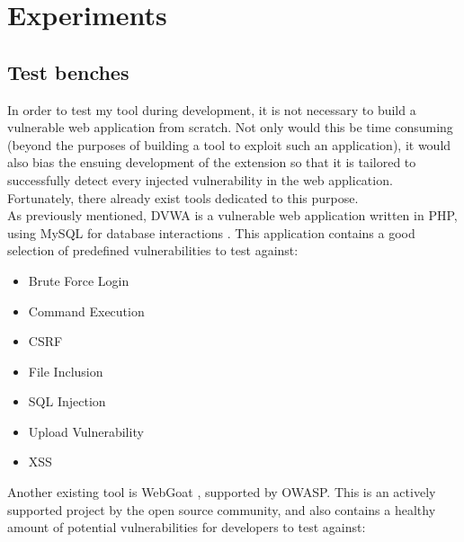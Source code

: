 \section{Experiments}


\subsection{Test benches}
In order to test my tool during development, it is not necessary to build a vulnerable web application from scratch. Not only would this be time consuming (beyond the purposes of building a tool to exploit such an application), it would also bias the ensuing development of the extension so that it is tailored to successfully detect every injected vulnerability in the web application. Fortunately, there already exist tools dedicated to this purpose. \\

As previously mentioned, DVWA is a vulnerable web application written in PHP, using MySQL for database interactions \cite{dvwaSite}. This application contains a good selection of predefined vulnerabilities to test against:
\begin{multicols}{3}
	\begin{itemize}
		\item Brute Force Login
		\item Command Execution
		\item CSRF
		\item File Inclusion
		\item SQL Injection
		\item Upload Vulnerability
		\item XSS	
	\end{itemize}
\end{multicols}

Another existing tool is WebGoat \cite{webgoatIntro, webgoatGithub}, supported by OWASP. This is an actively supported project by the open source community, and also contains a healthy amount of potential vulnerabilities for developers to test against:

